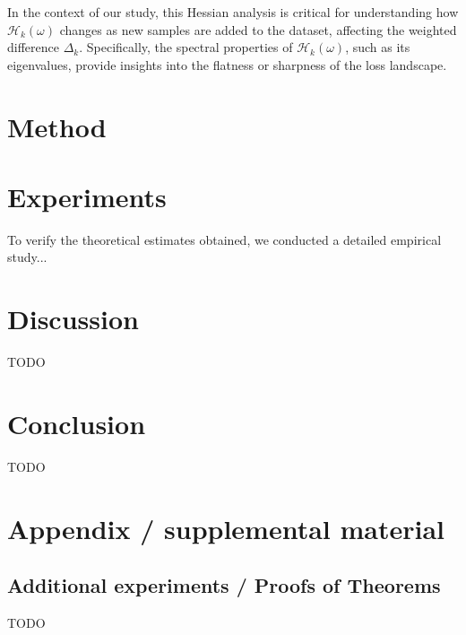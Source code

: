 \documentclass{article}
\begin{document}
In the context of our study, this Hessian analysis is critical for understanding how $\mathcal{H}_k(\omega)$ changes as new samples are added to the dataset, affecting the weighted difference $\Delta_k$. Specifically, the spectral properties of $\mathcal{H}_k(\omega)$, such as its eigenvalues, provide insights into the flatness or sharpness of the loss landscape.

\section{Method}\label{sec:method}

\section{Experiments}\label{sec:exp}

To verify the theoretical estimates obtained, we conducted a detailed empirical study...

\section{Discussion}\label{sec:disc}

TODO

\section{Conclusion}\label{sec:concl}

TODO







\newpage
\appendix
\section{Appendix / supplemental material}\label{app}

\subsection{Additional experiments / Proofs of Theorems}\label{app:exp}

TODO
\end{document}
